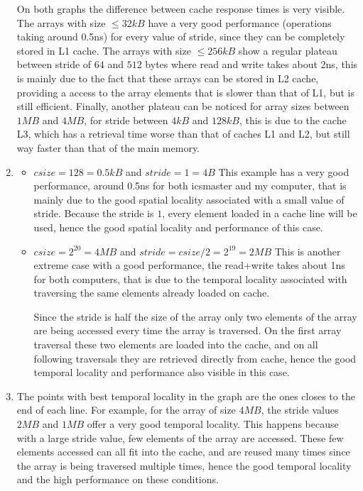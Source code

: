 \documentclass[unicode,11pt,a4paper,oneside,numbers=endperiod,openany]{scrartcl}
\begin{document}
\begin{enumerate}
        On both graphs the difference between cache response times is very visible.
        The arrays with size $\leq 32kB$ have a very good performance (operations taking around 0.5ns) for every value of stride, since they can be completely stored in L1 cache.
        The arrays with size $\leq 256kB$ show a regular plateau between stride of $64$ and $512$ bytes where read and write takes about 2ns, this is mainly due to the fact that these arrays can be stored in L2 cache, providing a access to the array elements that is slower than that of L1, but is still efficient.
        Finally, another plateau can be noticed for array sizes between $1MB$ and $4MB$, for stride between $4kB$ and $128kB$, this is due to the cache L3, which has a retrieval time worse than that of caches L1 and L2, but still way faster than that of the main memory.

        \item 
            \begin{itemize}
                \item $csize = 128 = 0.5kB$ and $stride = 1 = 4B$
                    This example has a very good performance, around 0.5ns for both icsmaster and my computer, that is mainly due to the good spatial locality associated with a small value of stride.
                    Because the stride is $1$, every element loaded in a cache line will be used, hence the good spatial locality and performance of this case.

                \item $csize = 2^{20} = 4MB$ and $stride = csize/2 = 2^{19} = 2MB$
                    This is another extreme case with a good performance, the read+write takes about 1ns for both computers, that is due to the temporal locality associated with traversing the same elements already loaded on cache.
                    
                    Since the stride is half the size of the array only two elements of the array are being accessed every time the array is traversed.
                    On the first array traversal these two elements are loaded into the cache, and on all following traversals they are retrieved directly from cache, hence the good temporal locality and performance also visible in this case.
            \end{itemize}

        \item  The points with best temporal locality in the graph are the ones closes to the end of each line.
            For example, for the array of size $4MB$, the stride values $2MB$ and $1MB$ offer a very good temporal locality.
            This happens because with a large stride value, few elements of the array are accessed. 
            These few elements accessed can all fit into the cache, and are reused many times since the array is being traversed multiple times, hence the good temporal locality and the high performance on these conditions.


\end{enumerate}
\end{document}
